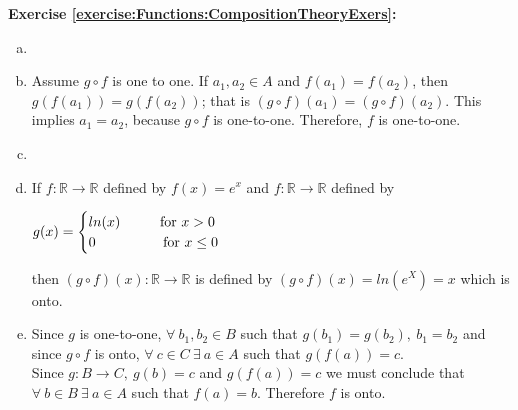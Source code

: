 \noindent\textbf{Exercise \ref{exercise:Functions:CompositionTheoryExers}:} %
\begin{enumerate}[(a)]
\item \label{CompositionTheoryExers-gof11} 
  
\item \label{CompositionTheoryExers-f11} 
Assume $g\circ f$ is one to one. If $a_{1},a_{2}\in A$ and $f(a_{1}) = f(a_{2})$, then $g(f(a_{1})) = g(f(a_{2}))$; that is $(g\circ f)(a_{1}) = (g\circ f)(a_{2})$. This implies $a_{1} = a_{2}$, because $g\circ f$ is one-to-one. Therefore, $f$ is one-to-one.

\item \label{CompositionTheoryExers-gonto} 
 
\item \label{CompositionTheoryExers-egNotOnto} 
If $f\colon \mathbb{R}\to \mathbb{R}$ defined by $f(x) = e^x$ and $f\colon \mathbb{R}\to \mathbb{R}$ defined by
\begin{center}
$g(x) =
\begin{cases}
ln(x)\hspace{1cm} \text{for\ } x>0\\
0 \hspace{1.7cm} \text{for\ } x\leq 0\\
\end{cases}$
\end{center}
then $(g\circ f)(x):\mathbb{R}\to \mathbb{R}$ is  defined by $(g\circ f)(x) = ln(e^{X}) = x$ which is onto.

\item \label{CompositionTheoryExers-fonto} 
Since $g$ is one-to-one, $\forall\  b_{1},b_{2}\in B$ such that $g(b_{1}) = g(b_{2}),\ b_{1} = b_{2}$ and since $g\circ f$ is onto, $\forall\ c\in C\ \exists\ a\in A$ such that $g(f(a))=c$.\\
Since $g\colon B\to C,\ g(b) = c$ and $g(f(a)) = c$ we must conclude that $\forall\ b\in B\ \exists\ a\in A$ such that $f(a) = b$. Therefore $f$ is onto.


\end{enumerate}
